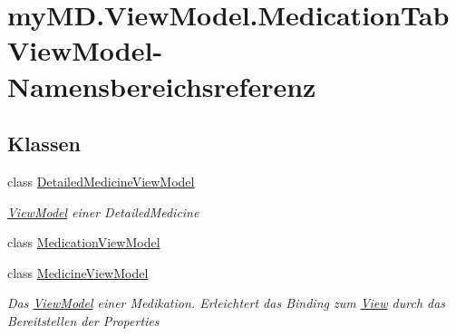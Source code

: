 \hypertarget{namespacemy_m_d_1_1_view_model_1_1_medication_tab_view_model}{}\section{my\+M\+D.\+View\+Model.\+Medication\+Tab\+View\+Model-\/\+Namensbereichsreferenz}
\label{namespacemy_m_d_1_1_view_model_1_1_medication_tab_view_model}
\subsection*{Klassen}
\begin{DoxyCompactItemize}
\item 
class \mbox{\hyperlink{classmy_m_d_1_1_view_model_1_1_medication_tab_view_model_1_1_detailed_medicine_view_model}{Detailed\+Medicine\+View\+Model}}
\begin{DoxyCompactList}\small\item\em \mbox{\hyperlink{namespacemy_m_d_1_1_view_model}{View\+Model}} einer Detailed\+Medicine \end{DoxyCompactList}\item 
class \mbox{\hyperlink{classmy_m_d_1_1_view_model_1_1_medication_tab_view_model_1_1_medication_view_model}{Medication\+View\+Model}}
\item 
class \mbox{\hyperlink{classmy_m_d_1_1_view_model_1_1_medication_tab_view_model_1_1_medicine_view_model}{Medicine\+View\+Model}}
\begin{DoxyCompactList}\small\item\em Das \mbox{\hyperlink{namespacemy_m_d_1_1_view_model}{View\+Model}} einer Medikation. Erleichtert das Binding zum \mbox{\hyperlink{namespacemy_m_d_1_1_view}{View}} durch das Bereitstellen der Properties \end{DoxyCompactList}\end{DoxyCompactItemize}
